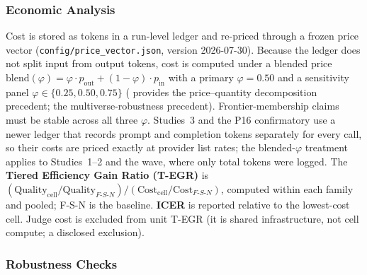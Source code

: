\documentclass[12pt,a4paper]{article}
\newcommand{\phiBlend}{\varphi}
\begin{document}
\subsubsection{Economic Analysis}

Cost is stored as tokens in a run-level ledger and re-priced through a frozen
price vector (\texttt{config/price\_vector.json}, version 2026-07-30). Because
the ledger does not split input from output tokens, cost is computed under a
blended price $\mathrm{blend}(\phiBlend) = \phiBlend \cdot p_{\mathrm{out}} +
(1 - \phiBlend) \cdot p_{\mathrm{in}}$ with a primary $\phiBlend = 0.50$ and a
sensitivity panel $\phiBlend \in \{0.25, 0.50, 0.75\}$ (\citealt{Diewert1976}
provides the price--quantity decomposition precedent; \citealt{SteegenEtAl2016}
the multiverse-robustness precedent). Frontier-membership claims must be stable
across all three $\phiBlend$. Studies~3 and the P16 confirmatory use a newer
ledger that records prompt and completion tokens separately for every call, so
their costs are priced exactly at provider list rates; the
blended-$\phiBlend$ treatment applies to Studies~1--2 and the wave, where only
total tokens were logged. The \textbf{Tiered Efficiency Gain Ratio (T-EGR)}
is $(\mathrm{Quality}_{\mathrm{cell}} / \mathrm{Quality}_{F\text{-}S\text{-}N})
/ (\mathrm{Cost}_{\mathrm{cell}} / \mathrm{Cost}_{F\text{-}S\text{-}N})$,
computed within each family and pooled; F-S-N is the baseline. \textbf{ICER} is
reported relative to the lowest-cost cell. Judge cost is excluded from unit T-EGR
(it is shared infrastructure, not cell compute; a disclosed exclusion).

\subsubsection{Robustness Checks}
\end{document}
